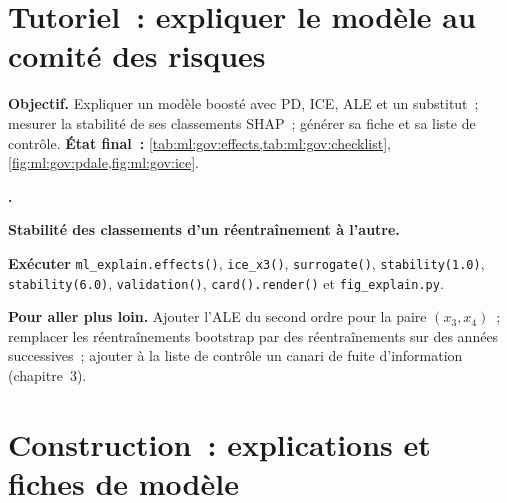 \section{Tutoriel~: expliquer le modèle au comité des risques}\label{tut:ml:interpretability-and-model-governance:tut}

\begin{tutorial}
\textbf{Objectif.} Expliquer un modèle boosté avec PD, ICE, ALE et un substitut~; mesurer la stabilité de ses classements SHAP~; générer
sa fiche et sa liste de contrôle. \textbf{État final~:} \cref{tab:ml:gov:effects,tab:ml:gov:checklist},
\cref{fig:ml:gov:pdale,fig:ml:gov:ice}.
\begin{tutsteps}
\item \textbf{.}
\label{lst:ml:gov:ale}
\item \textbf{Stabilité des classements d'un réentraînement à l'autre.}
\label{lst:ml:gov:stab}
\item \textbf{Exécuter} \texttt{ml\_explain.effects()}, \texttt{ice\_x3()}, \texttt{surrogate()}, \texttt{stability(1.0)},
\texttt{stability(6.0)}, \texttt{validation()}, \texttt{card().render()} et \texttt{fig\_explain.py}.
\end{tutsteps}
\textbf{Pour aller plus loin.} Ajouter l'ALE du second ordre pour la paire $(x_3, x_4)$~; remplacer les réentraînements bootstrap par
des réentraînements sur des années successives~; ajouter à la liste de contrôle un canari de fuite d'information (chapitre~3).
\end{tutorial}

\section{Construction~: explications et fiches de modèle}\label{bld:ml:interpretability-and-model-governance:modelcard}

